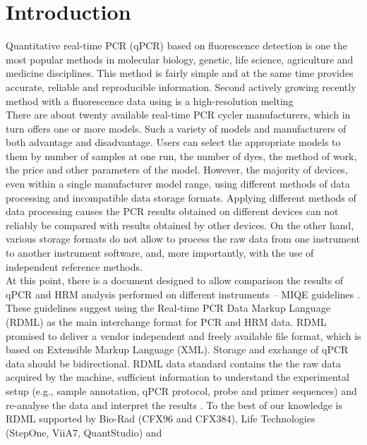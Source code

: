 \documentclass{bioinfo}
\begin{document}
\section{Introduction}

Quantitative real-time PCR (qPCR) based on fluorescence detection is one the 
most popular methods in molecular biology, genetic, life science, agriculture 
and medicine disciplines. This method is fairly simple and at the same time 
provides accurate, reliable and reproducible 
information\cite{kubista_real-time_2006}. Second actively growing recently 
method with a fluorescence data using is a high-resolution melting 
\cite{reed_high-resolution_2007}\cite{wittwer_high-resolution_2009}\\
There are about twenty available real-time PCR cycler manufacturers, which in 
turn offers one or more models. Such a variety of models and manufacturers of 
both advantage and disadvantage. Users can select the appropriate models to them 
by number of samples at one run, the number of dyes, the method of work, the 
price and other parameters of the model. However, the majority of devices, even 
within a single manufacturer model range, using different methods of data 
processing and incompatible data storage formats. Applying different methods of 
data processing causes the PCR results obtained on different devices can not 
reliably be compared with results obtained by other devices. On the other hand, 
various storage formats do not allow to process the raw data from one instrument 
to another instrument software, and, more importantly, with the use of 
independent reference methods.\\
At this point, there is a document designed to allow comparison the results of 
qPCR and HRM analysis performed on different instruments -- MIQE guidelines 
\cite{bustin_miqe_2009, huggett_2013}. These guidelines suggest using the 
Real-time PCR Data Markup Language (RDML) as the main interchange format for PCR 
and HRM data. RDML promised to deliver a vendor independent and freely available 
file format, which is based on Extensible Markup Language (XML). Storage and 
exchange of qPCR data should be bidirectional. RDML data standard contains the 
the raw data acquired by the machine, sufficient information to understand the 
experimental setup (e.g., sample annotation, qPCR protocol, probe and primer 
sequences) and re-analyse the data and interpret the results 
\cite{lefever_rdml:_2009}. To the best of our knowledge is RDML  supported by 
Bio-Rad (CFX96 and CFX384), Life Technologies (StepOne, ViiA7, QuantStudio) and 
\end{document}
